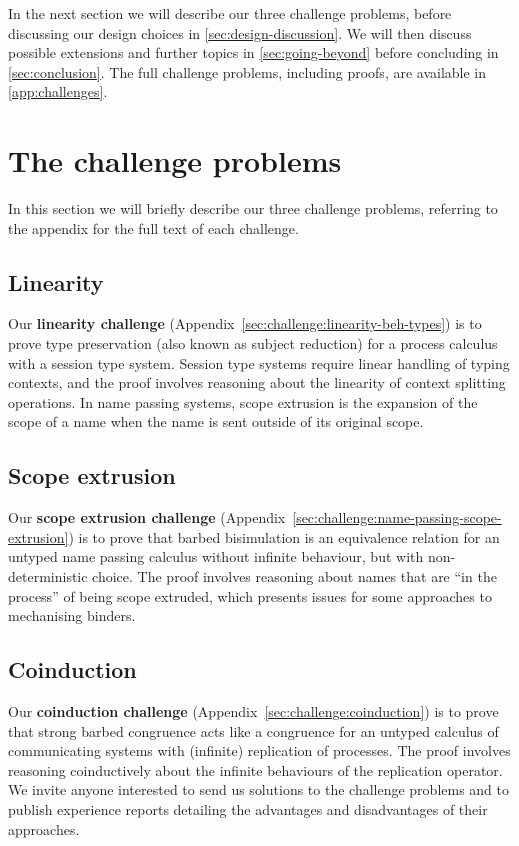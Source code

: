 \documentclass[runningheads]{llncs}
\begin{document}
In the next section we will describe our three challenge problems, before discussing our design choices in \cref{sec:design-discussion}.
We will then discuss possible extensions and further topics in \cref{sec:going-beyond} before concluding in \cref{sec:conclusion}.
The full challenge problems, including proofs, are available in \cref{app:challenges}.

\section{The challenge problems}
In this section we will briefly describe our three challenge problems, referring to the appendix for the full text of each challenge.

\subsection{Linearity}
Our \textbf{linearity challenge} (Appendix~\ref{sec:challenge:linearity-beh-types}) is to prove type preservation (also known as subject reduction) for a process calculus with a session type system.
Session type systems require linear handling of typing contexts, and the proof involves reasoning about the linearity of context splitting operations.
In name passing systems, scope extrusion is the expansion of the scope of a name when the name is sent outside of its original scope.

\subsection{Scope extrusion}
Our \textbf{scope extrusion challenge} (Appendix~\ref{sec:challenge:name-passing-scope-extrusion}) is to prove that barbed bisimulation is an equivalence relation for an untyped name passing calculus without infinite behaviour, but with non-deterministic choice.
The proof involves reasoning about names that are ``in the process'' of being scope extruded, which presents issues for some approaches to mechanising binders.

\subsection{Coinduction}
Our \textbf{coinduction challenge} (Appendix~\ref{sec:challenge:coinduction}) is to prove that strong barbed congruence acts like a congruence for an untyped calculus of communicating systems with (infinite) replication of processes.
The proof involves reasoning coinductively about the infinite behaviours of the replication operator.
We invite anyone interested to send us solutions to the challenge problems and to publish experience reports detailing the advantages and disadvantages of their approaches.
\end{document}
